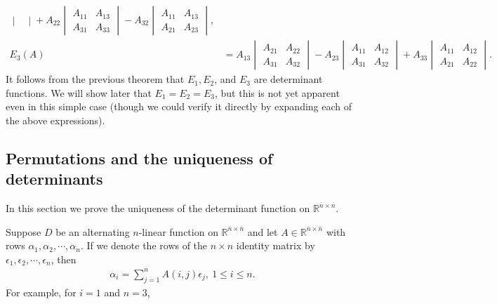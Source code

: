 \documentclass[12pt,letterpaper,reqno]{article}
\numberwithin{equation}{section}
\newcommand{\fixme}[1]{{\color{orange}{[#1]}}}
\begin{document}
\begin{example}
\begin{align*}
\begin{vmatrix}
	\end{vmatrix}+A_{22}\begin{vmatrix}
		A_{11} & A_{13} \\ A_{31} & A_{33}
	\end{vmatrix} - A_{32}\begin{vmatrix}
		A_{11} & A_{13} \\ A_{21} & A_{23}
	\end{vmatrix}, \\
	E_3(A) &= A_{13}\begin{vmatrix}
		A_{21} & A_{22} \\ A_{31} & A_{32}
	\end{vmatrix} - A_{23} \begin{vmatrix}
		A_{11} & A_{12} \\ A_{31} & A_{32}
	\end{vmatrix} + A_{33}\begin{vmatrix}
		A_{11} & A_{12} \\ A_{21} & A_{22}
	\end{vmatrix}.
\end{align*}
It follows from the previous theorem that $E_1, E_2$, and $E_3$ are determinant functions. We will show later that $E_1=E_2=E_3$, but this is not yet apparent even in this simple case (though we could verify it directly by expanding each of the above expressions).
\end{example}

\fixme{Add exercises here?}

\subsection{Permutations and the uniqueness of determinants}
In this section we prove the uniqueness of the determinant function on $\mathbb{R}^{\overline{n} \times \overline{n}}$.

Suppose $D$ be an alternating $n$-linear function on $\mathbb{R}^{\overline{n} \times \overline{n}}$ and let $A \in \mathbb{R}^{\overline{n} \times \overline{n}}$ with rows $\alpha_1,\alpha_2,\cdots,\alpha_n$. If we denote the rows of the $n \times n$ identity matrix by $\epsilon_1,\epsilon_2,\cdots,\epsilon_n$, then
\begin{align*}
	\alpha_i=\sum_{j=1}^nA(i,j)\epsilon_j, \ 1 \leq i \leq n.
\end{align*}
For example, for $i=1$ and $n=3$,
\end{document}
